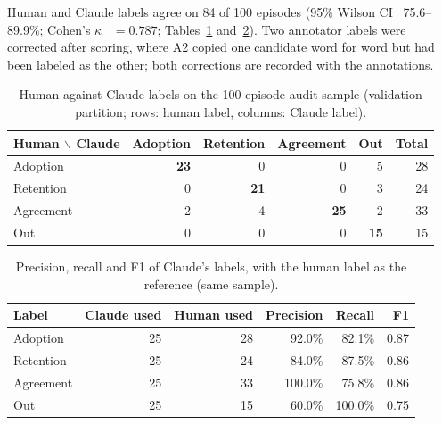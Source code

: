 Human and Claude labels agree on 84 of 100 episodes (95\% Wilson
CI~\cite{wilson1927probable} 75.6--89.9\%; Cohen's
$\kappa$~\cite{cohen1960kappa} $= 0.787$; Tables~\ref{tab:audit-confusion}
and~\ref{tab:audit-classes}). Two annotator labels were corrected after
scoring, where A2 copied one candidate word for word but had been labeled as
the other; both corrections are recorded with the annotations.

\begin{table}[htbp]
    \centering
    \caption{Human against Claude labels on the 100-episode audit sample
    (validation partition; rows: human label, columns: Claude label).}
    \label{tab:audit-confusion}
    \begin{tabular}{lrrrrr}
        \toprule
        Human $\backslash$ Claude & Adoption & Retention & Agreement & Out & Total \\
        \midrule
        Adoption  & \textbf{23} & 0  & 0  & 5  & 28 \\
        Retention & 0  & \textbf{21} & 0  & 3  & 24 \\
        Agreement & 2  & 4  & \textbf{25} & 2  & 33 \\
        Out       & 0  & 0  & 0  & \textbf{15} & 15 \\
        \bottomrule
    \end{tabular}
\end{table}

\begin{table}[htbp]
    \centering
    \caption{Precision, recall and F1 of Claude's labels, with the human label
    as the reference (same sample).}
    \label{tab:audit-classes}
    \begin{tabular}{lrrrrr}
        \toprule
        Label & Claude used & Human used & Precision & Recall & F1 \\
        \midrule
        Adoption  & 25 & 28 & 92.0\%  & 82.1\%  & 0.87 \\
        Retention & 25 & 24 & 84.0\%  & 87.5\%  & 0.86 \\
        Agreement & 25 & 33 & 100.0\% & 75.8\%  & 0.86 \\
        Out       & 25 & 15 & 60.0\%  & 100.0\% & 0.75 \\
        \bottomrule
    \end{tabular}
\end{table}

